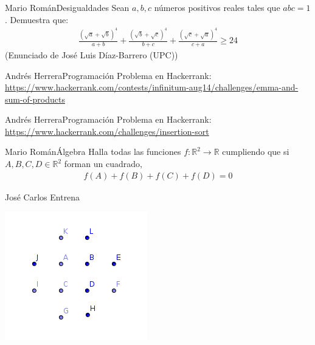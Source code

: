 \documentclass[a4paper, 11pt]{article} %
\numberwithin{prbcounter}{section}
\begin{document}
  
  
  \begin{enunciado}{Mario Román}{Desigualdades}
    Sean $a, b, c$ números positivos reales tales que $abc = 1$. Demuestra que:
    \begin{gather*}
      \frac{\left(\sqrt{a}+\sqrt{b}\right)^4}{a+b}+\frac{\left(\sqrt{b}+\sqrt{c}\right)^4}{b+c}+\frac{\left(\sqrt{c}+\sqrt{a}\right)^4}{c+a}\geq24
    \end{gather*}
    (Enunciado de José Luis Díaz-Barrero (UPC))
  \end{enunciado}

  
  
  \begin{enunciado}{Andrés Herrera}{Programación}
    Problema en Hackerrank:
    \url{https://www.hackerrank.com/contests/infinitum-aug14/challenges/emma-and-sum-of-products}
  \end{enunciado}

  
  
  
  \begin{enunciado}{Andrés Herrera}{Programación}
    Problema en Hackerrank:
    \url{https://www.hackerrank.com/challenges/insertion-sort}
  \end{enunciado}
    
    
  
  \begin{enunciado}{Mario Román}{Álgebra}
    Halla todas las funciones $f: \mathbb{R}^2 \rightarrow \mathbb{R}$ cumpliendo
    que si $A,B,C,D \in \mathbb{R}^2$ forman un cuadrado,
    \begin{gather*}
      f(A) + f(B) + f(C) + f(D) = 0
    \end{gather*}
  \end{enunciado}
  
  \begin{solucion}{José Carlos Entrena}
    \begin{center}
      \includegraphics{problema6.png}
    \end{center}
  \end{solucion}
\end{document}
